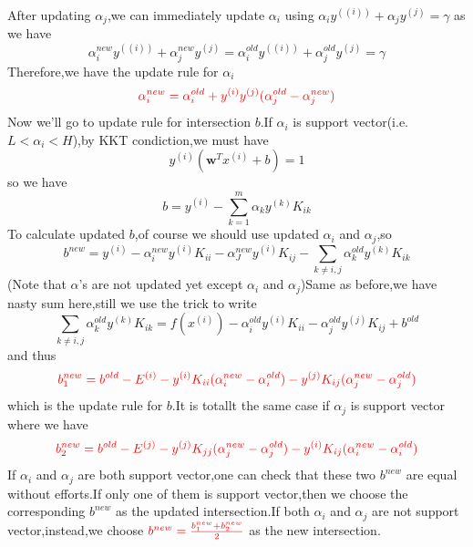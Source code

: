 \documentclass{article}
\begin{document}
After updating $\alpha_j$,we can immediately update $\alpha_i$ using $\alpha_i y^{((i))}+\alpha_j y^{(j)}=\gamma$ as we have$$\alpha_i^{new} y^{((i))}+\alpha_j^{new} y^{(j)}=\alpha_i^{old} y^{((i))}+\alpha_j^{old} y^{(j)}=\gamma$$Therefore,we have the update rule for $\alpha_i$ $$\textcolor{red}{\alpha_i^{new}=\alpha_i^{old}+y^{(i)}y^{(j)}(\alpha_j^{old}-\alpha_j^{new})}$$
Now we'll go to update rule for intersection $b$.If $\alpha_i$ is support vector(i.e. $L<\alpha_i<H$),by KKT condiction,we must have$$y^{(i)}(\bm{w}^{T}x^{(i)}+b)=1$$
so we have$$b=y^{(i)}-\sum_{k=1}^{m}\alpha_k y^{(k)}K_{ik}$$
To calculate updated $b$,of course we should use updated $\alpha_i$ and $\alpha_j$,so$$b^{new}=y^{(i)}-\alpha_i^{new}y^{(i)}K_{ii}-\alpha_J^{new}y^{(i)}K_{ij}-\underset{k\ne i,j}{\sum}\alpha_k^{old} y^{(k)}K_{ik}$$
(Note that $\alpha$'s are not updated yet except $\alpha_i$ and $\alpha_j$)Same as before,we have nasty sum here,still we use the trick to write$$\underset{k\ne i,j}{\sum}\alpha_k^{old} y^{(k)}K_{ik}=f(x^{(i)})-\alpha_i^{old}y^{(i)}K_{ii}-\alpha_j^{old}y^{(j)}K_{ij}+b^{old}$$and thus $$\textcolor{red}{b_1^{new}=b^{old}-E^{(i)}-y^{(i)}K_{ii}(\alpha_i^{new}-\alpha_i^{old})-y^{(j)}K_{ij}(\alpha_j^{new}-\alpha_j^{old})}$$which is the update rule for $b$.It is totallt the same case if $\alpha_j$ is support vector where we have$$\textcolor{red}{b_2^{new}=b^{old}-E^{(j)}-y^{(j)}K_{jj}(\alpha_j^{new}-\alpha_j^{old})-y^{(i)}K_{ij}(\alpha_i^{new}-\alpha_i^{old})}$$If $\alpha_i$ and $\alpha_j$ are both support vector,one can check that these two $b^{new}$ are equal without efforts.If only one of them is support vector,then we choose the corresponding $b^{new}$ as the updated intersection.If both $\alpha_i$ and $\alpha_j$ are not support vector,instead,we choose $\textcolor{red}{b^{new}=\frac{b_1^{new}+b_2^{new}}{2}}$ as the new intersection.
\end{document}
